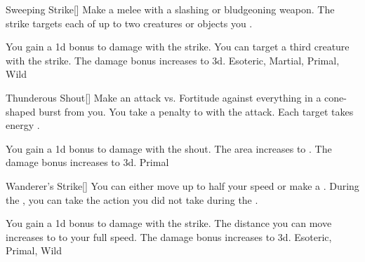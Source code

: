 \lowercase{\hypertarget{maneuver:Sweeping Strike}{}}\label{maneuver:Sweeping Strike}
\hypertarget{maneuver:Sweeping Strike}{}
\begin{freeability}{Sweeping Strike}[]
Make a melee  with a slashing or bludgeoning weapon.
The strike targets each of up to two creatures or objects you .

\rankline
{} You gain a \plus1d bonus to damage with the strike.
 You can target a third creature with the strike.
 The damage bonus increases to \plus3d.
 Esoteric, Martial, Primal, Wild
\end{freeability}
\vspace{0.25em}



\lowercase{\hypertarget{maneuver:Thunderous Shout}{}}\label{maneuver:Thunderous Shout}
\hypertarget{maneuver:Thunderous Shout}{}
\begin{freeability}{Thunderous Shout}[]
Make an attack vs. Fortitude against everything in a \areamed cone-shaped burst from you.
You take a  penalty to  with the attack.
\hit Each target takes energy .

\rankline
{} You gain a \plus1d bonus to damage with the shout.
 The area increases to \arealarge.
 The damage bonus increases to \plus3d.
 Primal
\end{freeability}
\vspace{0.25em}



\lowercase{\hypertarget{maneuver:Wanderer's Strike}{}}\label{maneuver:Wanderer's Strike}
\hypertarget{maneuver:Wanderer's Strike}{}
\begin{freeability}{Wanderer's Strike}[]
You can either move up to half your speed or make a .
During the , you can take the action you did not take during the .

\rankline
{} You gain a \plus1d bonus to damage with the strike.
 The distance you can move increases to to your full speed.
 The damage bonus increases to \plus3d.
 Esoteric, Primal, Wild
\end{freeability}
\vspace{0.25em}



